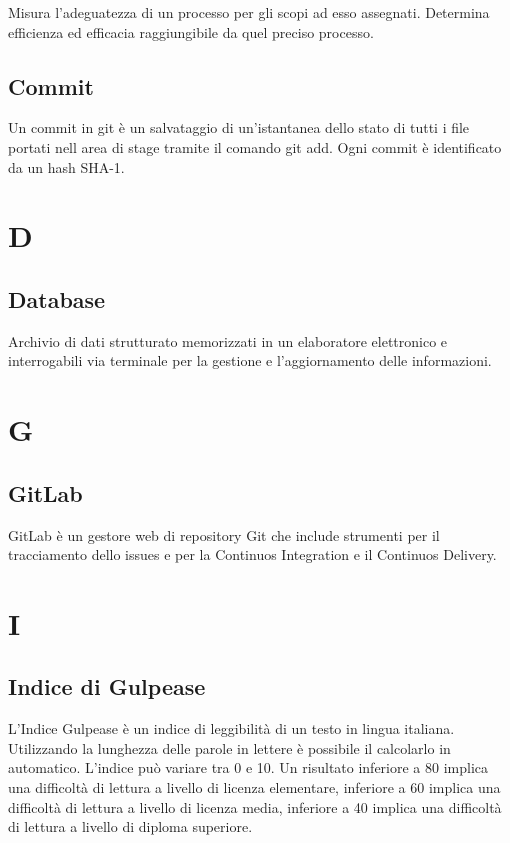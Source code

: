 	Misura l'adeguatezza di un processo per gli scopi ad esso assegnati. Determina efficienza ed efficacia raggiungibile da quel preciso processo.
	\subsection{Commit}
	Un commit in git è un salvataggio di un'istantanea dello stato di tutti i file portati nell area di stage tramite il comando git add. Ogni commit è identificato da un hash SHA-1.
	
	\section{D}
	\subsection{Database}
	
	Archivio di dati strutturato  memorizzati in un elaboratore elettronico e interrogabili via terminale per la gestione e l'aggiornamento delle informazioni.
	\section{G}

	\subsection{GitLab} 
	GitLab è un gestore web di repository Git che include strumenti per il tracciamento dello issues e per la Continuos Integration e il Continuos Delivery.
	
	
	\section{I}

	\subsection{Indice di Gulpease}
	
	L'Indice Gulpease è un indice di leggibilità di un testo in lingua italiana. Utilizzando la lunghezza delle parole in lettere è possibile il calcolarlo in automatico.
	L'indice può variare tra 0 e 10. Un risultato inferiore a 80 implica una difficoltà di lettura a livello di licenza elementare, inferiore a 60 implica una difficoltà di lettura a livello di licenza media, inferiore a 40 implica una difficoltà di lettura a livello di diploma superiore.
